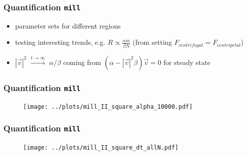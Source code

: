 \documentclass[compress]{beamer}
\begin{document}
\begin{frame}
	\frametitle{Quantification \texttt{mill}}
	\begin{itemize}
		\item parameter sets for different regions
		\item testing interesting trends, e.g. \( R \propto \frac{\alpha m}{\beta N}\) (from setting \( F_{centrifugal} = F_{centripetal} \))
		\item \( |\vec{v}|^{2} \) \( \xrightarrow{t \to \infty} \) \( \alpha / \beta \) coming from \( (\alpha - |\vec{v}|^2 \beta ) \vec{v} = 0 \) for steady state
	\end{itemize}
\end{frame}



\begin{frame}
	\frametitle{Quantification \texttt{mill}}
	\begin{figure}[H]
		\texttt{[image: ../plots/mill\_II\_square\_alpha\_10000.pdf]}
	\end{figure}
\end{frame}

\begin{frame}
	\frametitle{Quantification \texttt{mill}}	
	\begin{figure}[H]
		\texttt{[image: ../plots/mill\_II\_square\_dt\_allN.pdf]}
	\end{figure}	
\end{frame}
\end{document}
